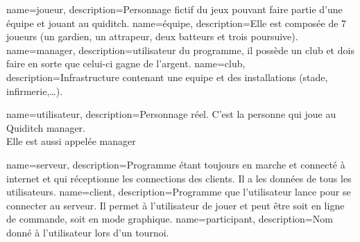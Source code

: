 {
    name=joueur,
    description={Personnage fictif du jeux pouvant faire partie d'une équipe et jouant au quiditch.}
}
{
    name=équipe,
    description={Elle est composée de 7 \glspl{joueur} (un gardien, un attrapeur, deux batteurs et trois poursuive).}
}
{
    name=manager,
    description={\Gls{utilisateur} du programme, il possède un \gls{club} et dois faire en sorte que celui-ci gagne de l'argent.}
}
{
    name=club,
    description={Infrastructure contenant une \gls{equipe} et des installations (stade, infirmerie,\ldots).}
}

{
    name=utilisateur,
    description={Personnage réel. C'est la personne qui joue au Quiditch manager.\\
    Elle est aussi appelée \gls{manager}}
}

{
    name=serveur,
    description={Programme étant toujours en marche et connecté à internet et qui réceptionne les connections des \glspl{client}. Il a les données de tous les \glspl{utilisateur}.}
}
{
    name=client,
    description={Programme que l'\gls{utilisateur} lance pour se connecter au \gls{serveur}. Il permet à l'\gls{utilisateur} de jouer et peut être soit en ligne de commande, soit en mode graphique.}
}
{
    name=participant,
    description={Nom donné à l'\gls{utilisateur} lors d'un tournoi.}
}


